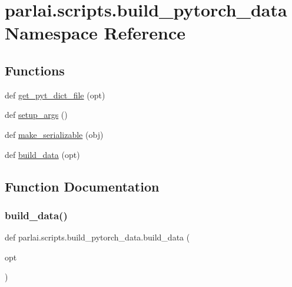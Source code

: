 \hypertarget{namespaceparlai_1_1scripts_1_1build__pytorch__data}{}\section{parlai.\+scripts.\+build\+\_\+pytorch\+\_\+data Namespace Reference}
\label{namespaceparlai_1_1scripts_1_1build__pytorch__data}
\subsection*{Functions}
\begin{DoxyCompactItemize}
\item 
def \hyperlink{namespaceparlai_1_1scripts_1_1build__pytorch__data_a6ec85a5842150af78f5178d75075b0cc}{get\+\_\+pyt\+\_\+dict\+\_\+file} (opt)
\item 
def \hyperlink{namespaceparlai_1_1scripts_1_1build__pytorch__data_afd88c85ffdbc233b56542e013352351a}{setup\+\_\+args} ()
\item 
def \hyperlink{namespaceparlai_1_1scripts_1_1build__pytorch__data_a1c8f4633b7dc8e990a3e1f6c3e92bd3f}{make\+\_\+serializable} (obj)
\item 
def \hyperlink{namespaceparlai_1_1scripts_1_1build__pytorch__data_a50d93b1dec37499085b9eafc6e425a1a}{build\+\_\+data} (opt)
\end{DoxyCompactItemize}


\subsection{Function Documentation}
\mbox{\label{namespaceparlai_1_1scripts_1_1build__pytorch__data_a50d93b1dec37499085b9eafc6e425a1a}} 
\subsubsection{\texorpdfstring{build\+\_\+data()}{build\_data()}}
{\footnotesize\ttfamily def parlai.\+scripts.\+build\+\_\+pytorch\+\_\+data.\+build\+\_\+data (\begin{DoxyParamCaption}\item[{}]{opt }\end{DoxyParamCaption})}



